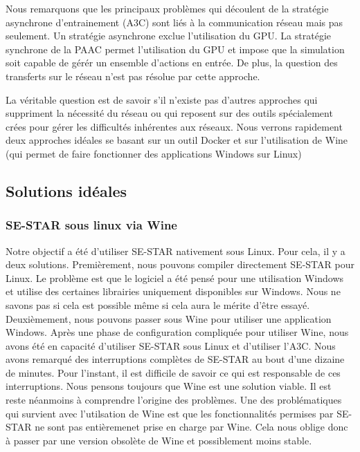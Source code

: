 Nous remarquons que les principaux problèmes qui découlent de la stratégie asynchrone d'entrainement (A3C) sont liés à la communication réseau mais pas seulement. Un stratégie asynchrone exclue l'utilisation du \gls{GPU}. La stratégie synchrone de la \gls{PAAC} permet l'utilisation du GPU et impose que la simulation soit capable de gérér un ensemble d'actions en entrée. De plus, la question des transferts sur le réseau n'est pas résolue par cette approche. 

La véritable question est de savoir s'il n'existe pas d'autres approches qui suppriment la nécessité du réseau ou qui reposent sur des outils spécialement crées pour gérer les difficultés inhérentes aux réseaux. Nous verrons rapidement deux approches idéales se basant sur un outil Docker \cite{Merkel:2014:DLL:2600239.2600241} et sur l'utilisation de \gls{Wine} (qui permet de faire fonctionner des applications Windows sur Linux)

\subsection{Solutions idéales}

\subsubsection{SE-STAR sous linux via \gls{Wine}}
Notre objectif a été d'utiliser SE-STAR nativement sous Linux. Pour cela, il y a deux solutions. 
Premièrement, nous pouvons compiler directement SE-STAR pour Linux. Le problème est que le logiciel a été pensé pour une utilisation Windows et utilise des certaines librairies uniquement disponibles sur Windows. Nous ne savons pas si cela est possible même si cela aura le mérite d'être essayé. 
Deuxièmement, nous pouvons passer sous Wine pour utiliser une application Windows. Après une phase de configuration compliquée pour utiliser Wine, nous avons été en capacité d'utiliser SE-STAR sous Linux et d'utiliser l'\gls{A3C}. Nous avons remarqué des interruptions complètes de SE-STAR au bout d'une dizaine de minutes. Pour l'instant, il est difficile de savoir ce qui est responsable de ces interruptions. Nous pensons toujours que Wine est une solution viable. Il est reste néanmoins à comprendre l'origine des problèmes. Une des problématiques qui survient avec l'utilsation de Wine est que les fonctionnalités permises par SE-STAR ne sont pas entièremenet prise en charge par Wine. Cela nous oblige donc à passer par une version obsolète de Wine et possiblement moins stable.

